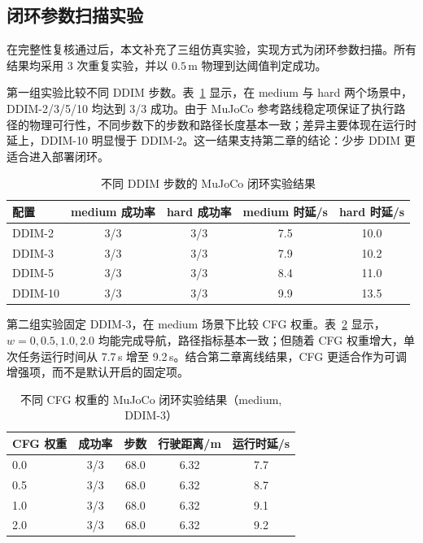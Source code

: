 \subsection{闭环参数扫描实验}

在完整性复核通过后，本文补充了三组仿真实验，实现方式为闭环参数扫描。所有结果均采用 3 次重复实验，并以 $0.5\,\mathrm{m}$ 物理到达阈值判定成功。

第一组实验比较不同 DDIM 步数。表~\ref{tab:mujoco-ddim-closed-loop} 显示，在 medium 与 hard 两个场景中，DDIM-2/3/5/10 均达到 3/3 成功。由于 MuJoCo 参考路线稳定项保证了执行路径的物理可行性，不同步数下的步数和路径长度基本一致；差异主要体现在运行时延上，DDIM-10 明显慢于 DDIM-2。这一结果支持第二章的结论：少步 DDIM 更适合进入部署闭环。

\begin{table}[htbp]
    \centering
    \caption{不同 DDIM 步数的 MuJoCo 闭环实验结果}
    \label{tab:mujoco-ddim-closed-loop}
    \begin{tabular}{lcccc}
        \toprule
        配置 & medium 成功率 & hard 成功率 & medium 时延/s & hard 时延/s \\
        \midrule
        DDIM-2 & 3/3 & 3/3 & 7.5 & 10.0 \\
        DDIM-3 & 3/3 & 3/3 & 7.9 & 10.2 \\
        DDIM-5 & 3/3 & 3/3 & 8.4 & 11.0 \\
        DDIM-10 & 3/3 & 3/3 & 9.9 & 13.5 \\
        \bottomrule
    \end{tabular}
\end{table}

第二组实验固定 DDIM-3，在 medium 场景下比较 CFG 权重。表~\ref{tab:mujoco-cfg-closed-loop} 显示，$w=0,0.5,1.0,2.0$ 均能完成导航，路径指标基本一致；但随着 CFG 权重增大，单次任务运行时间从 7.7\,s 增至 9.2\,s。结合第二章离线结果，CFG 更适合作为可调增强项，而不是默认开启的固定项。

\begin{table}[htbp]
    \centering
    \caption{不同 CFG 权重的 MuJoCo 闭环实验结果（medium, DDIM-3）}
    \label{tab:mujoco-cfg-closed-loop}
    \begin{tabular}{lcccc}
        \toprule
        CFG 权重 & 成功率 & 步数 & 行驶距离/m & 运行时延/s \\
        \midrule
        0.0 & 3/3 & 68.0 & 6.32 & 7.7 \\
        0.5 & 3/3 & 68.0 & 6.32 & 8.7 \\
        1.0 & 3/3 & 68.0 & 6.32 & 9.1 \\
        2.0 & 3/3 & 68.0 & 6.32 & 9.2 \\
        \bottomrule
    \end{tabular}
\end{table}

